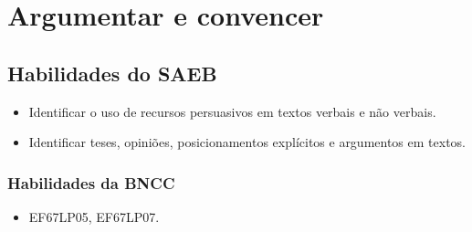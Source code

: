 \chapter{Argumentar e convencer}

\section{Habilidades do SAEB}

\begin{itemize}

  \item Identificar o uso de recursos persuasivos em textos verbais e não verbais.

  \item Identificar teses, opiniões, posicionamentos explícitos e argumentos em textos.

\end{itemize}

\subsection{Habilidades da BNCC} 

\begin{itemize}

  \item EF67LP05, EF67LP07.

\end{itemize}

